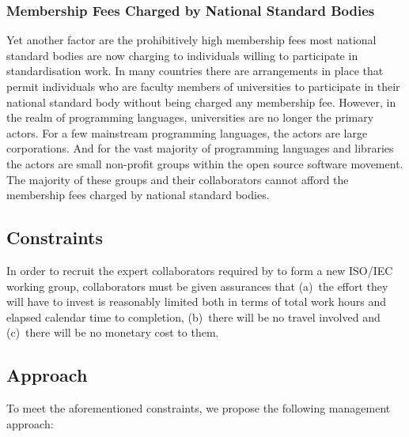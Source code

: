\documentclass[10pt,a4paper,leqno,fleqn]{article}
\begin{document}
\subsubsection{Membership Fees Charged by National Standard Bodies}
Yet another factor are the prohibitively high membership fees most national
standard bodies are now charging to individuals willing to participate in
standardisation work. In many countries there are arrangements in place that
permit individuals who are faculty members of universities to participate in their
national standard body without being charged any membership fee. However,
in the realm of programming languages, universities are no longer the primary
actors. For a few mainstream programming languages, the actors are large
corporations. And for the vast majority of programming languages and libraries
the actors are small non-profit groups within the open source software movement.
The majority of these groups and their collaborators cannot afford the membership
fees charged by national standard bodies.

\subsection{Constraints}
In order to recruit the expert collaborators required by \cite{II2020} to form a new
ISO/IEC working group, collaborators must be given assurances that (a)~the effort
they will have to invest is reasonably limited both in terms of total work hours and
elapsed calendar time to completion, (b)~there will be no travel involved and
(c)~there will be no monetary cost to them.

\subsection{Approach}
To meet the aforementioned constraints, we propose the following management
approach:
\end{document}

